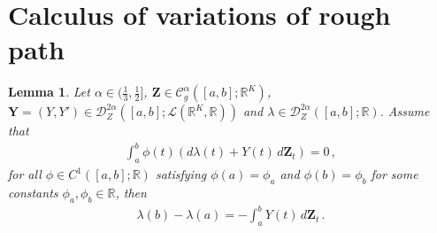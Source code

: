 \documentclass[11pt, oneside]{article}
\numberwithin{equation}{section}
\newtheorem{lemma}{Lemma}[section]
\theoremstyle{definition}
\newcommand{\mc}[1]{\mathcal{#1}}
\newcommand{\mcal}[1]{\mc{#1}}
\begin{document}
\section{Calculus of variations of rough path}
\begin{lemma} \label{lemma:foundamental}
    Let $\alpha \in (\frac{1}{3}, \frac{1}{2}]$, $\mathbf{Z} \in \mcal{C}^\alpha_g([a,b];\mathbb{R}^K)$, $\mathbf{Y} = (Y, Y') \in \mcal{D}^{2\alpha}_Z([a,b];\mcal{L}(\mathbb{R}^K, \mathbb{R}))$ and $\lambda \in \mcal{D}^{2\alpha}_Z([a,b];\mathbb{R})$. Assume that 
    \begin{align}
        \int_a^b \phi(t)\left( d \lambda(t) + Y(t)\,d \mathbf{Z}_t\right) = 0\,,
    \end{align}
    for all $\phi \in C^1([a,b];\mathbb{R})$ satisfying $\phi(a) = \phi_a$ and $\phi(b) = \phi_b$ for some constants $\phi_a, \phi_b \in \mathbb{R}$, then
    \begin{align}
        \lambda(b) - \lambda(a) = -\int_a^b Y(t)\,d\mathbf{Z}_t\,.
    \end{align}
\end{lemma}
\end{document}
